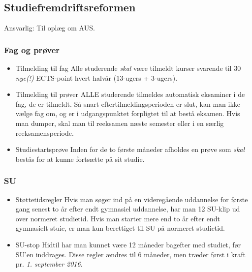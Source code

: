 \subsection*{Studiefremdriftsreformen}
Ansvarlig: \Mighty
Til oplæg om AUS. 
\subsubsection*{Fag og prøver}
\label{sub:fag_og_pr_ver}
\begin{itemize}
  \item{Tilmelding til fag} Alle studerende \emph{skal} være tilmeldt kurser svarende til 30 \emph{nye(!)} ECTS-point hvert halvår (13-ugers + 3-ugers).
  \item{Tilmelding til prøver} ALLE studerende tilmeldes automatisk eksaminer i de fag, de er tilmeldt. Så snart eftertilmeldingsperioden er slut, kan man ikke vælge fag om, og er i udgangspunktet forpligtet til at bestå eksamen. Hvis man dumper, skal man til reeksamen næste semester eller i en særlig reeksamensperiode.
  \item{Studiestartsprøve} Inden for de to første måneder afholdes en prøve som \emph{skal} bestås for at kunne fortsætte på sit studie.
\end{itemize}

\subsubsection*{SU}
\label{sub:SU}
\begin{itemize}
  \item{Støttetidsregler} Hvis man søger ind på en videregående uddannelse for første gang senest to år efter endt gymnasiel uddannelse, har man 12 SU-klip ud over normeret studietid. Hvis man starter mere end to år efter endt gymnasielt stuie, er man kun berettiget til SU på normeret studietid.
  \item{SU-stop} Hidtil har man kunnet være 12 måneder bagefter med studiet, før SU'en inddrages. Disse regler ændres til 6 måneder, men træder først i kraft pr. \emph{1. september 2016}.
\end{itemize}
